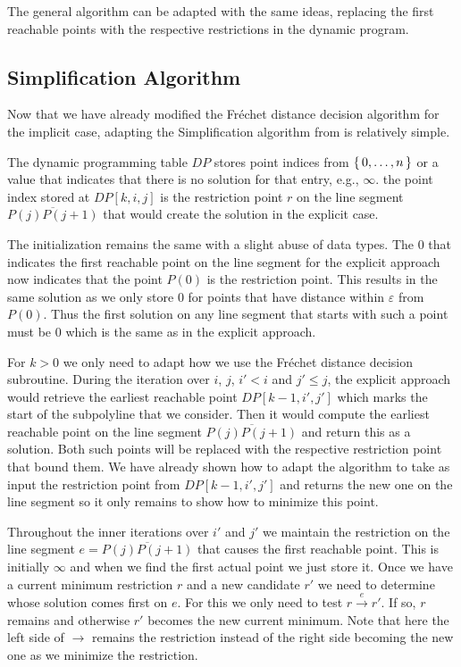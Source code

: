 The general algorithm can be adapted with the same ideas, replacing the first reachable points with the respective restrictions in the dynamic program. 

\subsection{Simplification Algorithm}
Now that we have already modified the Fréchet distance decision algorithm for the implicit case, adapting the Simplification algorithm from \citeauthor{on_optimal_polyline_simplification_using_the_hausdorff_and_frechet_distance} is relatively simple. 

The dynamic programming table \(DP\) stores point indices from \(\set{0, \dots, n}\) or a value that indicates that there is no solution for that entry, e.g., \(\infty\). the point index stored at \(DP[k,i,j]\) is the restriction point \(r\) on the line segment \(\overline{P(j)P(j+1)}\) that would create the solution in the explicit case. 

The initialization remains the same with a slight abuse of data types. The \(0\) that indicates the first reachable point on the line segment for the explicit approach now indicates that the point \(P(0)\) is the restriction point. This results in the same solution as we only store \(0\) for points that have distance within \(\varepsilon\) from \(P(0)\). Thus the first solution on any line segment that starts with such a point must be \(0\) which is the same as in the explicit approach.

For \(k > 0\) we only need to adapt how we use the Fréchet distance decision subroutine. During the iteration over \(i\), \(j\), \(i' < i\) and \(j' \leq j\), the explicit approach would retrieve the earliest reachable point \(DP[k-1, i', j']\) which marks the start of the subpolyline that we consider. Then it would compute the earliest reachable point on the line segment \(\overline{P(j)P(j+1)}\) and return this as a solution. Both such points will be replaced with the respective restriction point that bound them. We have already shown how to adapt the algorithm to take as input the restriction point from \(DP[k-1,i',j']\) and returns the new one on the line segment so it only remains to show how to minimize this point. 

Throughout the inner iterations over \(i'\) and \(j'\) we maintain the restriction on the line segment \(e = \overline{P(j)P(j+1)}\) that causes the first reachable point. This is initially \(\infty\) and when we find the first actual point we just store it. Once we have a current minimum restriction \(r\) and a new candidate \(r'\) we need to determine whose solution comes first on \(e\). For this we only need to test \(r \overset e\to r'\). If so, \(r\) remains and otherwise \(r'\) becomes the new current minimum. Note that here the left side of \(\to\) remains the restriction instead of the right side becoming the new one as we minimize the restriction.

